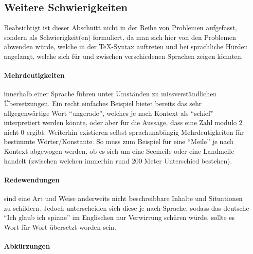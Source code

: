 \subsection{Weitere Schwierigkeiten}\label{subsec:weitereschwierigkeiten}
Beabsichtigt ist dieser Abschnitt nicht in der Reihe von Problemen aufgefasst, sondern als Schwierigkeit$($en$)$ formuliert, da man sich hier von den Problemen abwenden würde, welche in der \TeX{}-Syntax auftreten und bei sprachliche Hürden angelangt, welche sich für und zwischen verschiedenen Sprachen zeigen könnten.

\paragraph*{Mehrdeutigkeiten} innerhalb einer Sprache führen unter Umständen zu missverständlichen Übersetzungen. Ein recht einfaches Beispiel bietet bereits das sehr allgegenwärtige Wort \enquote{ungerade}, welches je nach Kontext als \enquote{schief} interpretiert werden könnte, oder aber für die Aussage, dass eine Zahl modulo 2 nicht 0 ergibt. Weiterhin existieren selbst sprachunabängig Mehrdeutigkeiten für bestimmte Wörter/Konstante. So muss zum Beispiel für eine \enquote{Meile} je nach Kontext abgewogen werden, ob es sich um eine Seemeile oder eine Landmeile handelt (zwischen welchen immerhin rund 200 Meter Unterschied bestehen).  %

\paragraph*{Redewendungen} sind eine Art und Weise anderweits nicht beschreibbare Inhalte und Situationen zu schildern. Jedoch unterscheiden sich diese je nach Sprache, sodass das deutsche \enquote{Ich glaub ich spinne} im Englischen nur Verwirrung schüren würde, sollte es Wort für Wort übersetzt worden sein.

\paragraph*{Abkürzungen}

